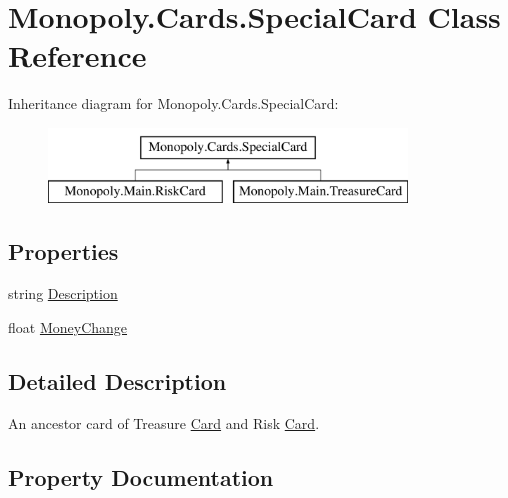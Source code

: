 \hypertarget{class_monopoly_1_1_cards_1_1_special_card}{}\section{Monopoly.\+Cards.\+Special\+Card Class Reference}
\label{class_monopoly_1_1_cards_1_1_special_card}
Inheritance diagram for Monopoly.\+Cards.\+Special\+Card\+:\begin{figure}[H]
\begin{center}
\leavevmode
\includegraphics[height=2.000000cm]{class_monopoly_1_1_cards_1_1_special_card}
\end{center}
\end{figure}
\subsection*{Properties}
\begin{DoxyCompactItemize}
\item 
string \mbox{\hyperlink{class_monopoly_1_1_cards_1_1_special_card_a7404d6bf23aa3858a8831075162bcb66}{Description}}
\item 
float \mbox{\hyperlink{class_monopoly_1_1_cards_1_1_special_card_ab81aa9650e34745aa35b313730a8c0c4}{Money\+Change}}
\end{DoxyCompactItemize}


\subsection{Detailed Description}
An ancestor card of Treasure \mbox{\hyperlink{class_monopoly_1_1_cards_1_1_card}{Card}} and Risk \mbox{\hyperlink{class_monopoly_1_1_cards_1_1_card}{Card}}. 

\subsection{Property Documentation}
\mbox{\label{class_monopoly_1_1_cards_1_1_special_card_a7404d6bf23aa3858a8831075162bcb66}} 
